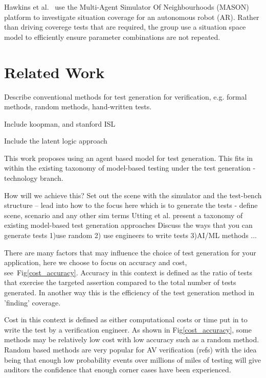 \documentclass[letterpaper, 10 pt, journal, twoside]{IEEEtran}
\begin{document}
Hawkins et al.~\cite{Hawkins} use the Multi-Agent Simulator Of Neighbourhoods (MASON) platform to investigate situation coverage for an autonomous robot (AR). Rather than driving coverege tests that are required, the group use a situation space model to efficiently ensure parameter combinations are not repeated.




\section{Related Work}
Describe conventional methods for test generation for verification, e.g. formal methods, random methods, hand-written tests.

Include koopman, and stanford ISL

Include the latent logic approach

This work proposes using an agent based model for test generation. This fits in within the existing taxonomy of model-based testing \cite{utting2012taxonomy} under the test generation - technology branch.

How will we achieve this? Set out the scene with the simulator and the test-bench structure -- lead into how to the focus here which is to  generate the tests - define scene, scenario and any other sim terms
Utting et al. \cite{utting2012taxonomy} present a taxonomy of existing model-based test generation approaches
%
Discuss the ways that you can generate tests 1)use random 2) use engineers to write tests 3)AI/ML methods ...

There are many factors that may influence the choice of test generation for your application, here we choose to focus on accuracy and cost, see~Fig\ref{cost_accuracy}. Accuracy in this context is defined as the ratio of tests that exercise the targeted assertion compared to the total number of tests generated. In another way this is the efficiency of the test generation method in 'finding' coverage.

Cost in this context is defined as either computational costs or time put in to write the test by a verification engineer. As shown in Fig\ref{cost_accuracy}, some methods may be relatively low cost with low accuracy such as a random method. Random based methods are very popular for AV verification (refs) with the idea being that enough low probability events over millions of miles of testing will give auditors the confidence that enough corner cases have been experienced.
\end{document}
